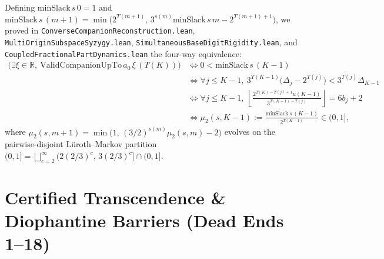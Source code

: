 \documentclass[11pt]{article}
\begin{document}
Defining $\mathrm{minSlack}\, s\, 0 = 1$ and $\mathrm{minSlack}\, s\, (m+1) = \min\big(2^{T(m+1)},\, 3^{s(m)}\mathrm{minSlack}\, s\, m - 2^{T(m+1)+1}\big)$, we proved in \texttt{ConverseCompanionReconstruction.lean}, \texttt{MultiOriginSubspaceSyzygy.lean}, \texttt{SimultaneousBaseDigitRigidity.lean}, and \texttt{CoupledFractionalPartDynamics.lean} the four-way equivalence:
\begin{align*}
  \big(\exists \xi \in \mathbb{R},\ \mathrm{ValidCompanionUpTo}\, a_0\, \xi\, (T(K))\big)
  &\iff 0 < \mathrm{minSlack}\, s\, (K - 1) \\
  &\iff \forall j \le K - 1,\ 3^{T(K-1)}\big(\Delta_j - 2^{T(j)}\big) < 3^{T(j)} \Delta_{K-1} \\
  &\iff \forall j \le K - 1,\ \left\lfloor \frac{2^{T(K) - T(j) + 1} u(K - 1)}{3^{T(K-1) - T(j)}} \right\rfloor = 6 b_j + 2 \\
  &\iff \mu_2(s, K - 1) := \frac{\mathrm{minSlack}\, s\, (K-1)}{2^{T(K-1)}} \in (0, 1],
\end{align*}
where $\mu_2(s, m+1) = \min\big(1,\, (3/2)^{s(m)} \mu_2(s, m) - 2\big)$ evolves on the pairwise-disjoint L\"uroth--Markov partition $(0, 1] = \bigsqcup_{c=2}^\infty (2(2/3)^c,\, 3(2/3)^c] \cap (0, 1]$.

\section{Certified Transcendence \& Diophantine Barriers (Dead Ends 1--18)}
\end{document}
